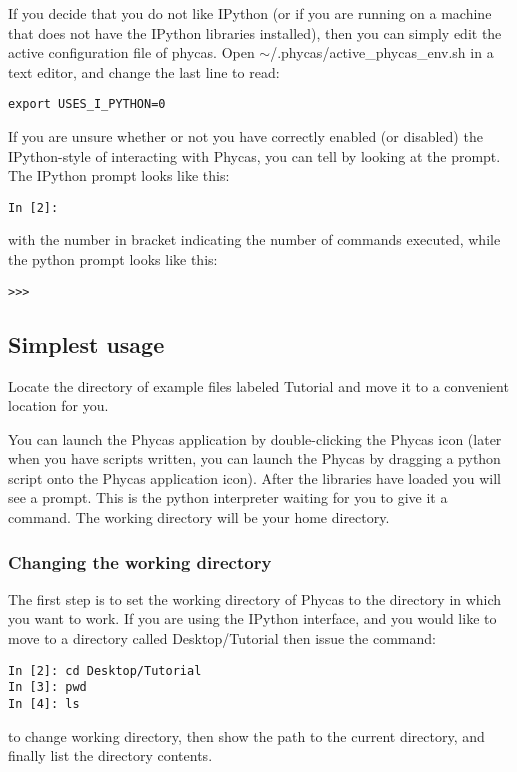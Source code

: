 \documentclass{article}
\newcommand{\phycas}{Phycas\xspace}
\newcommand{\localfile}[1]{\textsf{#1}\xspace}
\begin{document}
If you decide that you do not like IPython (or if you are running on a machine that does not have the IPython libraries installed), then you can simply edit the active configuration file of phycas. 
Open 
\localfile{$\sim$/.phycas/active\_phycas\_env.sh} 
in a text editor, and change the last line to read:
\begin{verbatim}
export USES_I_PYTHON=0
\end{verbatim}

If you are unsure whether or not you have correctly enabled (or disabled) the IPython-style of interacting with \phycas, you can tell by looking at the prompt.
The IPython prompt looks like this:
\begin{verbatim}
In [2]: 
\end{verbatim}
with the number in bracket indicating the number of commands executed, while the python prompt looks like this:
\begin{verbatim}
>>>
\end{verbatim}


\subsection{Simplest usage}
Locate the directory of example files labeled \localfile{Tutorial} and move it to a convenient location for you.


You can launch the \phycas application by double-clicking the \phycas icon  (later when you have scripts written, you can launch the \phycas by dragging a python script onto the \phycas application icon).
After the libraries have loaded you will see a prompt.
This is the python interpreter waiting for you to give it a command.
The working directory will be your home directory.

\subsubsection{Changing the working directory}
The first step is to set the working directory of \phycas to the directory in which you want to work.
If you are using the IPython interface, and you would like to  move to a directory called \localfile{Desktop/Tutorial} then issue the command:
\begin{verbatim}
In [2]: cd Desktop/Tutorial
In [3]: pwd
In [4]: ls
\end{verbatim}
to change working directory, then show the path to the current directory, and finally list the directory contents.
\end{document}
